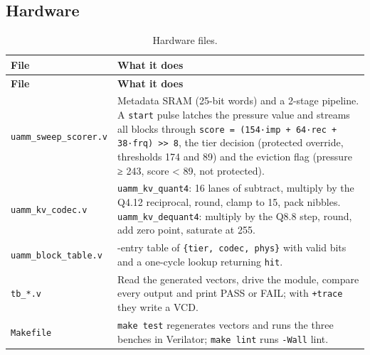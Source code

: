 \documentclass[12pt,a4paper]{report}
\begin{document}
\subsection{Hardware}\label{sec:6_4}
{\fontsize{8}{9.5}\selectfont\setlength{\tabcolsep}{3pt}
\begin{longtable}{>{\raggedright\arraybackslash}p{1.65in}>{\raggedright\arraybackslash}p{4.41in}}
\caption{Hardware files.}\\
\toprule
\textbf{File} & \textbf{What it does} \\\midrule\endfirsthead
\toprule \textbf{File} & \textbf{What it does} \\\midrule\endhead
\bottomrule\endfoot
\texttt{uamm\_\allowbreak{}\allowbreak{}sweep\_\allowbreak{}\allowbreak{}scorer.\allowbreak{}v} & Metadata SRAM (25-bit words) and a 2-stage pipeline. A \texttt{start} pulse latches the pressure value and streams all blocks through \texttt{score = (154·imp + 64·rec + 38·frq) >> 8}, the tier decision (protected override, thresholds 174 and 89) and the eviction flag (pressure ≥ 243, score < 89, not protected). \\
\texttt{uamm\_\allowbreak{}\allowbreak{}kv\_\allowbreak{}\allowbreak{}codec.\allowbreak{}v} & \texttt{uamm\_\allowbreak{}\allowbreak{}kv\_\allowbreak{}\allowbreak{}quant4}: 16 lanes of subtract, multiply by the Q4.12 reciprocal, round, clamp to 15, pack nibbles. \texttt{uamm\_\allowbreak{}\allowbreak{}kv\_\allowbreak{}\allowbreak{}dequant4}: multiply by the Q8.8 step, round, add zero point, saturate at 255. \\
\texttt{uamm\_\allowbreak{}\allowbreak{}block\_\allowbreak{}\allowbreak{}table.\allowbreak{}v} & 256-entry table of \texttt{\{tier, codec, phys\}} with valid bits and a one-cycle lookup returning \texttt{hit}. \\
\texttt{tb\_\allowbreak{}\allowbreak{}*.\allowbreak{}v} & Read the generated vectors, drive the module, compare every output and print PASS or FAIL; with \texttt{+trace} they write a VCD. \\
\texttt{Makefile} & \texttt{make test} regenerates vectors and runs the three benches in Verilator; \texttt{make lint} runs \texttt{-Wall} lint. \\
\bottomrule
\end{longtable}}
\end{document}
